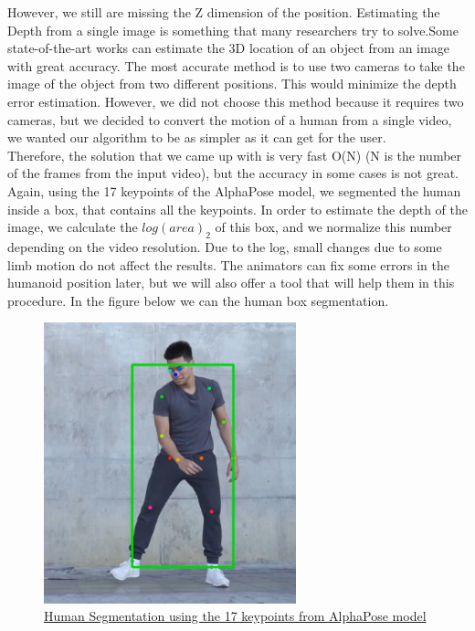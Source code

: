 However, we still are missing the Z dimension of the position. Estimating the Depth from a single image is something that many researchers try to solve.Some state-of-the-art works can estimate the 3D location of an object from an image with great accuracy. The most accurate method is to use two cameras to take the image of the object from two different positions. This would minimize the depth error estimation. However, we did not choose this method because it requires two cameras, but we decided to convert the motion of a human from a single video, we wanted our algorithm to be as simpler as it can get for the user.\\

Therefore, the solution that we came up with is very fast O(N) (N is the number of the frames from the input video), but the accuracy in some cases is not great. Again, using the 17 keypoints of the AlphaPose model, we segmented the human inside a box, that contains all the keypoints. In order to estimate the depth of the image, we calculate the $log(area)_2$ of this box, and we normalize this number depending on the video resolution. Due to the log, small changes due to some limb motion do not affect the results. The animators can fix some errors in the humanoid position later, but we will also offer a tool that will help them in this procedure. In the figure below we can the human box segmentation.

\pagebreak

\begin{figure}[h]
	\centering
	\includegraphics[width=0.65\textwidth]{figures/Implementation/position3D.png}
	\captionsetup{labelformat=empty}
	\caption{\href{https://www.pexels.com/search/videos/dance/}
	{Human Segmentation using the 17 keypoints from AlphaPose model}}
\end{figure}

